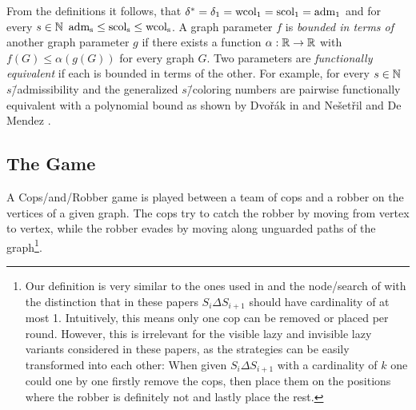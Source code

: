 From the definitions it follows, that $\delta^*=\delta_1=\mathrm{wcol_{1}}=\mathrm{scol_{1}}=\mathrm{adm_{1}}$ and for every $s\in \mathbb{N}$ $\mathrm{adm_{s}} \leq \mathrm{scol_{s}} \leq \mathrm{wcol_{s}}$. A graph parameter $f$ is \emph{bounded in terms of} another graph parameter $g$ if there exists a function $\alpha: \mathbb{R} \rightarrow \mathbb{R}$ with $f(G)\leq \alpha (g(G))$ for every graph $G$.
Two parameters are \emph{functionally equivalent} if each is bounded in terms of the other. For example, for every $s\in\mathbb{N}$ $s$\=/admissibility and the generalized $s$\=/coloring numbers are pairwise functionally equivalent with a polynomial bound as shown by Dvořák in \cite{DVORAK2013833} and Nešetřil and De Mendez \cite{nevsetvril2012sparsity}.\\

\subsection{The Game}
A Cops\-/and\-/Robber game is played between a team of cops and a robber on the vertices of a given graph.
The cops try to catch the robber by moving from vertex to vertex, while the robber evades by moving along unguarded paths of the graph\footnote{Our definition is very similar to the ones used in \cite{dendris1997fugitive} and the node\-/search of \cite{doi:10.1137/090780006} with the distinction that in these papers $S_i\Delta S_{i+1}$ should have cardinality of at most 1. Intuitively, this means only one cop can be removed or placed per round. However, this is irrelevant for the visible lazy and invisible lazy variants considered in these papers, as the strategies can be easily transformed into each other: When given $S_i\Delta S_{i+1}$ with a cardinality of $k$ one could one by one firstly remove the cops, then place them on the positions where the robber is definitely not and lastly place the rest.}.
